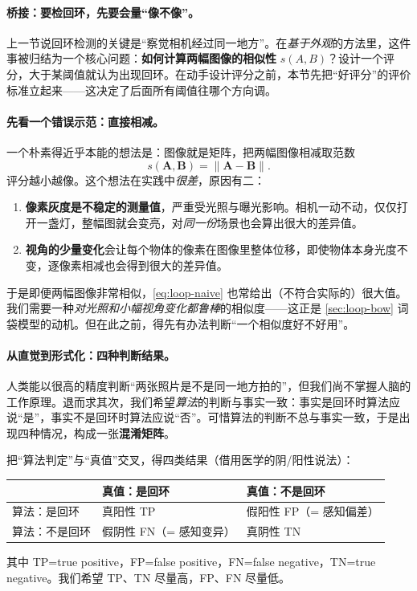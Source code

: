 \paragraph{桥接：要检回环，先要会量“像不像”。}
上一节说回环检测的关键是“察觉相机经过同一地方”。在\emph{基于外观}的方法里，这件事被归结为一个核心问题\cite{gaoxiang2019slam14}：\textbf{如何计算两幅图像的相似性} $s(A,B)$？设计一个评分，大于某阈值就认为出现回环。在动手设计评分之前，本节先把“好评分”的评价标准立起来——这决定了后面所有阈值往哪个方向调。

\paragraph{先看一个错误示范：直接相减。}
一个朴素得近乎本能的想法是：图像就是矩阵，把两幅图像相减取范数
\begin{equation}
  s(\mathbf A,\mathbf B)=\lVert\mathbf A-\mathbf B\rVert.
  \label{eq:loop-naive}
\end{equation}
评分越小越像。这个想法在实践中\emph{很差}，原因有二\cite{gaoxiang2019slam14}：
\begin{enumerate}
  \item \textbf{像素灰度是不稳定的测量值}，严重受光照与曝光影响。相机一动不动，仅仅打开一盏灯，整幅图就会变亮，对\emph{同一份}场景也会算出很大的差异值。
  \item \textbf{视角的少量变化}会让每个物体的像素在图像里整体位移，即使物体本身光度不变，逐像素相减也会得到很大的差异值。
\end{enumerate}
于是即便两幅图像非常相似，\cref{eq:loop-naive} 也常给出（不符合实际的）很大值。我们需要一种\emph{对光照和小幅视角变化都鲁棒}的相似度——这正是 \cref{sec:loop-bow} 词袋模型的动机。但在此之前，得先有办法判断“一个相似度好不好用”。

\paragraph{从直觉到形式化：四种判断结果。}
人类能以很高的精度判断“两张照片是不是同一地方拍的”，但我们尚不掌握人脑的工作原理\cite{gaoxiang2019slam14}。退而求其次，我们希望\emph{算法}的判断与事实一致：事实是回环时算法应说“是”，事实不是回环时算法应说“否”。可惜算法的判断不总与事实一致，于是出现四种情况，构成一张\textbf{混淆矩阵}。

\begin{definition}[回环检测的混淆矩阵]\label{def:loop-confusion}
把“算法判定”与“真值”交叉，得四类结果（借用医学的阴/阳性说法）：
\begin{center}
\small
\begin{tabular}{lll}
\toprule
 & 真值：是回环 & 真值：不是回环 \\
\midrule
算法：是回环 & 真阳性 TP & 假阳性 FP（= 感知偏差）\\
算法：不是回环 & 假阴性 FN（= 感知变异）& 真阴性 TN \\
\bottomrule
\end{tabular}
\end{center}
其中 TP=true positive，FP=false positive，FN=false negative，TN=true negative。我们希望 TP、TN 尽量高，FP、FN 尽量低。
\end{definition}

